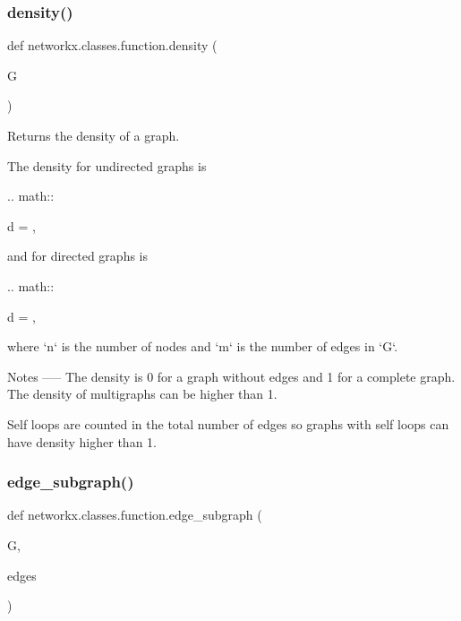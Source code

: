 \subsubsection{\texorpdfstring{density()}{density()}}
{\footnotesize\ttfamily def networkx.\+classes.\+function.\+density (\begin{DoxyParamCaption}\item[{}]{G }\end{DoxyParamCaption})}

\begin{DoxyVerb}Returns the density of a graph.

The density for undirected graphs is

.. math::

   d = ,

and for directed graphs is

.. math::

   d = ,

where `n` is the number of nodes and `m`  is the number of edges in `G`.

Notes
-----
The density is 0 for a graph without edges and 1 for a complete graph.
The density of multigraphs can be higher than 1.

Self loops are counted in the total number of edges so graphs with self
loops can have density higher than 1.
\end{DoxyVerb}
 \mbox{\label{namespacenetworkx_1_1classes_1_1function_a39d2d99f08dc6f638279d48ca07679c9}} 
\subsubsection{\texorpdfstring{edge\+\_\+subgraph()}{edge\_subgraph()}}
{\footnotesize\ttfamily def networkx.\+classes.\+function.\+edge\+\_\+subgraph (\begin{DoxyParamCaption}\item[{}]{G,  }\item[{}]{edges }\end{DoxyParamCaption})}

